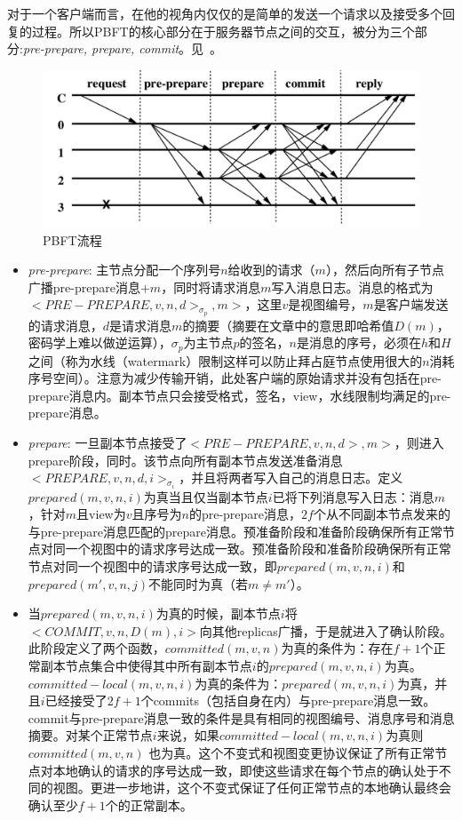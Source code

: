 对于一个客户端而言，在他的视角内仅仅的是简单的发送一个请求以及接受多个回复的过程。所以PBFT的核心部分在于服务器节点之间的交互，被分为三个部分:\emph{pre-prepare, prepare, commit}。见~。
\begin{figure}
	\centering
	\includegraphics[width=1\textwidth]{../common/PBFT_1.png}
	\caption{PBFT流程} 
	\label{fig:PBFT1}
\end{figure}
\begin{itemize}
	\item \emph{pre-prepare}: 主节点分配一个序列号$n$给收到的请求（$m$），然后向所有子节点广播pre-prepare消息$+m$，同时将请求消息$m$写入消息日志。消息的格式为$<PRE-PREPARE,v,n,d>_{\sigma_p},m>$，这里$v$是视图编号，$m$是客户端发送的请求消息，$d$是请求消息$m$的摘要（摘要在文章中的意思即哈希值$D(m)$，密码学上难以做逆运算），$\sigma_p$为主节点$p$的签名，$n$是消息的序号，必须在$h$和$H$之间（称为水线（watermark）限制这样可以防止拜占庭节点使用很大的$n$消耗序号空间）。注意为减少传输开销，此处客户端的原始请求并没有包括在pre-prepare消息内。副本节点只会接受格式，签名，view，水线限制均满足的pre-prepare消息。
	
    \item \emph{prepare}: 一旦副本节点接受了$<PRE-PREPARE,v,n,d>,m>$，则进入prepare阶段，同时。该节点向所有副本节点发送准备消息$<PREPARE,v,n,d,i>_{\sigma_i	}$，并且将两者写入自己的消息日志。定义$prepared(m,v,n,i)$为真当且仅当副本节点$i$已将下列消息写入日志：消息$m$，针对$m$且view为$v$且序号为$n$的pre-prepare消息，$2f$个从不同副本节点发来的与pre-prepare消息匹配的prepare消息。预准备阶段和准备阶段确保所有正常节点对同一个视图中的请求序号达成一致。预准备阶段和准备阶段确保所有正常节点对同一个视图中的请求序号达成一致，即$prepared(m,v,n,i)$和$prepared(m',v,n,j)$不能同时为真（若$m\neq m'$）。
    
    \item 当$prepared(m,v,n,i)$为真的时候，副本节点$i$将$<COMMIT,v,n,D(m),i>$向其他replicas广播，于是就进入了确认阶段。此阶段定义了两个函数，$committed(m,v,n)$为真的条件为：存在$f+1$个正常副本节点集合中使得其中所有副本节点$i$的$prepared(m,v,n,i)$为真。$committed-local(m,v,n,i)$为真的条件为：$prepared(m,v,n,i)$为真，并且$i$已经接受了$2f+1$个commits（包括自身在内）与pre-prepare消息一致。commit与pre-prepare消息一致的条件是具有相同的视图编号、消息序号和消息摘要。对某个正常节点$i$来说，如果$committed-local(m,v,n,i)$为真则$committed(m,v,n)$	也为真。这个不变式和视图变更协议保证了所有正常节点对本地确认的请求的序号达成一致，即使这些请求在每个节点的确认处于不同的视图。更进一步地讲，这个不变式保证了任何正常节点的本地确认最终会确认至少$f+1$个的正常副本。
\end{itemize}
